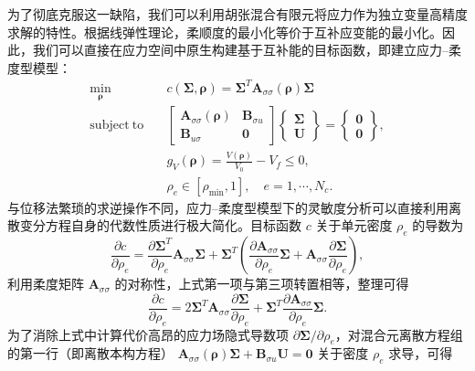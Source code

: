 为了彻底克服这一缺陷，我们可以利用胡张混合有限元将应力作为独立变量高精度求解的特性。根据线弹性理论，柔顺度的最小化等价于互补应变能的最小化。因此，我们可以直接在应力空间中原生构建基于互补能的目标函数，即建立应力{--}柔度型模型：
\begin{equation} \label{eq:ch5_hz_complementary_energy_model}
	\begin{aligned} 
		\min_{\boldsymbol{\rho}} \quad & c(\boldsymbol{\Sigma},\boldsymbol{\rho}) = \boldsymbol{\Sigma}^T\boldsymbol{A}_{\sigma\sigma}(\boldsymbol{\rho})\boldsymbol{\Sigma}\\ 
		\mathrm{subject~to} \quad & 
		\begin{bmatrix}
			\boldsymbol{A}_{\sigma\sigma}(\boldsymbol{\rho}) & \boldsymbol{B}_{\sigma{u}}\\
			\boldsymbol{B}_{u\sigma} & \boldsymbol{0}
		\end{bmatrix}
		\begin{Bmatrix}
			\boldsymbol\Sigma\\
			\boldsymbol{U}
		\end{Bmatrix} =  
		\begin{Bmatrix}
			\boldsymbol{0}\\
			\boldsymbol{0}
		\end{Bmatrix},\\
		& g_V(\boldsymbol{\rho}) = \frac{V(\boldsymbol{\rho})}{V_0} - V_f \leq 0,\\ 
		& \rho_e \in [\rho_{\min}, 1],\quad{e}=1,\cdots,N_c.
	\end{aligned}
\end{equation}
与位移法繁琐的求逆操作不同，应力{--}柔度型模型下的灵敏度分析可以直接利用离散变分方程自身的代数性质进行极大简化。目标函数 $c$ 关于单元密度 $\rho_e$ 的导数为
\[
\frac{\partial c}{\partial \rho_e} = \frac{\partial \boldsymbol{\Sigma}^T}{\partial \rho_e} \boldsymbol{A}_{\sigma\sigma} \boldsymbol{\Sigma} + \boldsymbol{\Sigma}^T \left( \frac{\partial \boldsymbol{A}_{\sigma\sigma}}{\partial \rho_e} \boldsymbol{\Sigma} + \boldsymbol{A}_{\sigma\sigma} \frac{\partial \boldsymbol{\Sigma}}{\partial \rho_e} \right),
\]
利用柔度矩阵 $\boldsymbol{A}_{\sigma\sigma}$ 的对称性，上式第一项与第三项转置相等，整理可得
\[
\frac{\partial c}{\partial \rho_e} = 2 \boldsymbol{\Sigma}^T \boldsymbol{A}_{\sigma\sigma} \frac{\partial \boldsymbol{\Sigma}}{\partial \rho_e} + \boldsymbol{\Sigma}^T \frac{\partial \boldsymbol{A}_{\sigma\sigma}}{\partial \rho_e} \boldsymbol{\Sigma}.
\]
为了消除上式中计算代价高昂的应力场隐式导数项 $\partial \boldsymbol{\Sigma} / \partial \rho_e$，对混合元离散方程组的第一行（即离散本构方程） $\boldsymbol{A}_{\sigma\sigma}(\boldsymbol{\rho})\boldsymbol{\Sigma} + \boldsymbol{B}_{\sigma u}\boldsymbol{U} = \boldsymbol{0}$ 关于密度 $\rho_e$ 求导，可得
